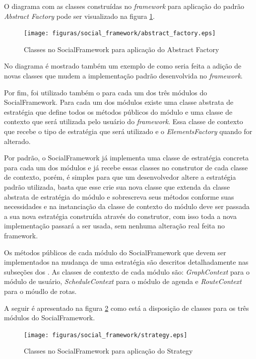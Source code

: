 O diagrama com as classes construídas no \textit{framework} para aplicação do padrão \textit{Abstract Factory} pode ser visualizado na figura \ref{padrao_abstract_factory}.

\newpage
\begin{figure}[h]
    \centering
    \texttt{[image: figuras/social\_framework/abstract\_factory.eps]}
    \caption{Classes no SocialFramework para aplicação do Abstract Factory}
    \label{padrao_abstract_factory}
\end{figure}

No diagrama é mostrado também um exemplo de como seria feita a adição de novas classes que mudem a implementação padrão desenvolvida no \textit{framework}.

Por fim, foi utilizado também o  para cada um dos três módulos do SocialFramework. Para cada um dos módulos existe uma classe abstrata de estratégia que define todos os métodos públicos do módulo e uma classe de contexto que será utilizada pelo usuário do \textit{framework}. Essa classe de contexto que recebe o tipo de estratégia que será utilizado e o \textit{ElementsFactory} quando for alterado.

Por padrão, o SocialFramework já implementa uma classe de estratégia concreta para cada um dos módulos e já recebe essas classes no construtor de cada classe de contexto, porém, é simples para que um desenvolvedor altere a estratégia padrão utilizada, basta que esse crie sua nova classe que extenda da classe abstrata de estratégia do módulo e sobrescreva seus métodos conforme suas necessidades e na instanciação da classe de contexto do módulo deve ser passada a sua nova estratégia construída através do construtor, com isso toda a nova implementação passará a ser usada, sem nenhuma alteração real feita no framework.

Os métodos públicos de cada módulo do SocialFramework que devem ser implementados na mudança de uma estratégia são descritos detalhadamente nas subseções dos . As classes de contexto de cada módulo são: \textit{GraphContext} para o módulo de usuário, \textit{ScheduleContext} para o módulo de agenda e \textit{RouteContext} para o móudlo de rotas.

A seguir é apresentado na figura \ref{padrao_strategy} como está a disposição de classes para os três módulos do SocialFramework.

\begin{figure}[h]
    \centering
    \texttt{[image: figuras/social\_framework/strategy.eps]}
    \caption{Classes no SocialFramework para aplicação do Strategy}
    \label{padrao_strategy}
\end{figure}

